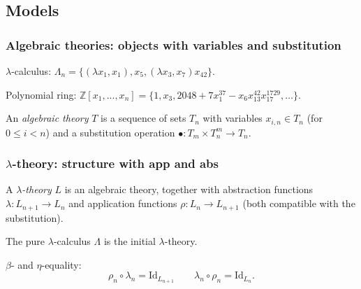 \documentclass[aspectratio=169]{fancyslides} %
\begin{document}
  \subsection{Models}
  \begin{frame}
    \frametitle{Algebraic theories: objects with variables and substitution}

    \begin{example}
      $ \lambda $-calculus: $ \Lambda_n = \{ (\lambda x_1, x_1), x_5, (\lambda x_3, x_7) x_{42} \} $.
    \end{example}

    \pause

    \begin{example}
      Polynomial ring: $ \mathbb Z[x_1, ..., x_n] = \{ 1, x_3, 2048 + 7 x_1^{37} - x_6 x_{13}^{42} x_{17}^{1729}, \dots \} $.
    \end{example}

    \pause

    \begin{definition}
      An \textit{algebraic theory} $ T $ is a sequence of sets $ T_n $ with variables $ x_{i, n} \in T_n $ (for $ 0 \leq i < n $) and a substitution operation $ \bullet : T_m \times T_n^m \to T_n $.
    \end{definition}
  \end{frame}

  \begin{frame}
    \frametitle{$ \lambda $-theory: structure with app and abs}

    \begin{definition}
      A \textit{$ \lambda $-theory} $ L $ is an algebraic theory, together with abstraction functions $ \lambda: L_{n + 1} \to L_n $ and application functions $ \rho: L_n \to L_{n + 1} $ (both compatible with the substitution).
    \end{definition}

    \pause

    The pure $ \lambda $-calculus $ \Lambda $ is the initial $ \lambda $-theory.

    \pause

    $ \beta $- and $ \eta $-equality:
    \[ \rho_n \circ \lambda_n = \mathrm{Id}_{L_{n + 1}} \qquad \lambda_n \circ \rho_n = \mathrm{Id}_{L_n}. \]
  \end{frame}
\end{document}
